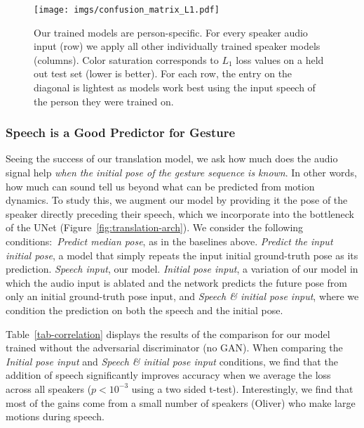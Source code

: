 \documentclass[10pt,twocolumn,letterpaper]{article}
\newcommand{\fig}[1]{Figure~\ref{#1}}
\newcommand{\unet}{UNet}
\begin{document}
\begin{figure}
\centering
\texttt{[image: imgs/confusion\_matrix\_L1.pdf]}
\vspace{-2mm}
  \caption{Our trained models are person-specific. For every speaker audio input (row) we apply all other individually trained speaker models (columns). Color saturation corresponds to $L_1$ loss values on a held out test set (lower is better). For each row, the entry on the diagonal is lightest as models work best using the input speech of the person they were trained on.}
\label{fig:cross-person}
\end{figure}


\subsubsection{Speech is a Good Predictor for Gesture}
Seeing the success of our translation model, we ask how much does the audio signal help {\em when the initial pose of the gesture sequence is known}. In other words, how much can sound tell us beyond what can be predicted from motion dynamics. To study this, we augment our model by providing it the pose of the speaker directly preceding their speech, which we incorporate into the bottleneck of the \unet{} (\fig{fig:translation-arch}). We consider the following conditions:~\textit{Predict median pose}, as in the baselines above. \textit{Predict the input initial pose}, a model that simply repeats the input initial ground-truth pose as its prediction. \textit{Speech input}, our model. \textit{Initial pose input}, a variation of our model in which the audio input is ablated and the network predicts the future pose from only an initial ground-truth pose input, and \textit{Speech \& initial pose input}, where we condition the prediction on both the speech and the initial pose.

Table~\ref{tab-correlation} displays the results of the comparison for our model trained without the adversarial discriminator (no GAN). When comparing the \textit{Initial pose input}  and \textit{Speech \& initial pose input} conditions, we find that the addition of speech significantly improves accuracy when we average the loss across all speakers ($p<10^{-3}$ using a two sided t-test). Interestingly, we find that most of the gains come from a small number of speakers (\eg Oliver) who make large motions during speech.
\end{document}
